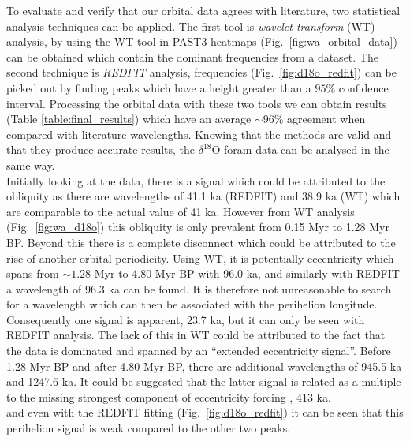 \documentclass[12pt, onecolumn]{revtex4}    %
\begin{document}

To evaluate and verify that our orbital data agrees with literature, two statistical analysis techniques can be applied. The first tool is \textit{wavelet transform} (WT) analysis, by using the WT tool in PAST3 \cite{past3} heatmaps (Fig.~\ref{fig:wa_orbital_data}) can be obtained which contain the dominant frequencies from a dataset. The second technique is \textit{REDFIT} analysis, frequencies (Fig.~\ref{fig:d18o_redfit}) can be picked out by finding peaks which have a height greater than a $95\%$ confidence interval. Processing the orbital data with these two tools we can obtain results (Table \ref{table:final_results}) which have an average $\sim 96 \%$ agreement when compared with literature wavelengths. Knowing that the methods are valid and that they produce accurate results, the $\delta^{18}$O foram data can be analysed in the same way. \\

Initially looking at the data, there is a signal which could be attributed to the obliquity as there are wavelengths of 41.1 ka (REDFIT) and 38.9 ka (WT) which are comparable to the actual value of 41 ka. However from WT analysis (Fig.~\ref{fig:wa_d18o}) this obliquity is only prevalent from 0.15 Myr to 1.28 Myr BP. Beyond this there is a complete disconnect which could be attributed to the rise of another orbital periodicity. Using WT, it is potentially eccentricity which spans from $\sim 1.28$ Myr to 4.80 Myr BP with 96.0 ka, and similarly with REDFIT a wavelength of 96.3 ka can be found.  It is therefore not unreasonable to search for a wavelength which can then be associated with the perihelion longitude. Consequently one signal is apparent, 23.7 ka, but it can only be seen with REDFIT analysis. The lack of this in WT could be attributed to the fact that the data is dominated and spanned by an ``extended eccentricity signal''. Before 1.28 Myr BP and after 4.80 Myr BP, there are additional wavelengths of 945.5 ka and 1247.6 ka. It could be suggested that the latter signal is related as a multiple to the missing strongest component of eccentricity forcing \cite{berger_climate}, 413 ka. \\

and even with the REDFIT fitting (Fig.~\ref{fig:d18o_redfit}) it can be seen that this perihelion signal is weak compared to the other two peaks. \\

\end{document}
